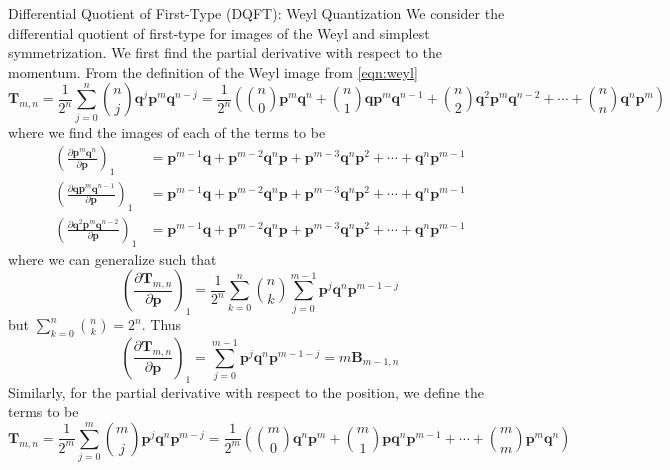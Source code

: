 \documentclass[aspectratio=169]{beamer}
\begin{document}
	\begin{frame}[allowframebreaks]{Differential Quotient of First-Type (DQFT): Weyl Quantization}
		We consider the differential quotient of first-type for images of the Weyl and simplest symmetrization. We first find the partial derivative with respect to the momentum. From the definition of the Weyl image from \ref{eqn:weyl}
		\begin{equation}
			\textbf{T}_{m,n}=\frac{1}{2^n}\sum_{j=0}^n\binom{n}{j}\textbf{q}^j\textbf{p}^m\textbf{q}^{n-j}=\frac{1}{2^n}\left(\binom{n}{0}\textbf{p}^m\textbf{q}^n+\binom{n}{1}\textbf{q}\textbf{p}^m\textbf{q}^{n-1}+\binom{n}{2}\textbf{q}^2\textbf{p}^m\textbf{q}^{n-2}+\cdots+\binom{n}{n}\textbf{q}^n\textbf{p}^m\right) 
		\end{equation}
		where we find the images of each of the terms to be
		\begin{align}
			\left(\frac{\partial\textbf{p}^m\textbf{q}^n}{\partial\textbf{p}}\right)_1&=\textbf{p}^{m-1}\textbf{q}+\textbf{p}^{m-2}\textbf{q}^n\textbf{p}+\textbf{p}^{m-3}\textbf{q}^n\textbf{p}^{2}+\cdots+\textbf{q}^n\textbf{p}^{m-1} \\
			\left(\frac{\partial\textbf{q}\textbf{p}^m\textbf{q}^{n-1}}{\partial\textbf{p}}\right)_1&=\textbf{p}^{m-1}\textbf{q}+\textbf{p}^{m-2}\textbf{q}^n\textbf{p}+\textbf{p}^{m-3}\textbf{q}^n\textbf{p}^{2}+\cdots+\textbf{q}^n\textbf{p}^{m-1} \\
			\left(\frac{\partial\textbf{q}^2\textbf{p}^m\textbf{q}^{n-2}}{\partial\textbf{p}}\right)_1&=\textbf{p}^{m-1}\textbf{q}+\textbf{p}^{m-2}\textbf{q}^n\textbf{p}+\textbf{p}^{m-3}\textbf{q}^n\textbf{p}^{2}+\cdots+\textbf{q}^n\textbf{p}^{m-1}
		\end{align}
		where we can generalize such that
		\begin{equation}
			\left(\frac{\partial\textbf{T}_{m,n}}{\partial\textbf{p}}\right)_1=\frac{1}{2^n}\sum_{k=0}^n\binom{n}{k}\sum_{j=0}^{m-1}\textbf{p}^j\textbf{q}^n\textbf{p}^{m-1-j}
		\end{equation}
		but $\displaystyle\sum_{k=0}^n\binom{n}{k}=2^n$. Thus
		\begin{equation}
			\left(\frac{\partial\textbf{T}_{m,n}}{\partial\textbf{p}}\right)_1=\sum_{j=0}^{m-1}\textbf{p}^j\textbf{q}^n\textbf{p}^{m-1-j}=m\textbf{B}_{m-1,n}
		\end{equation}
		Similarly, for the partial derivative with respect to the position, we define the terms to be
		\begin{equation}
			\textbf{T}_{m,n}=\frac{1}{2^m}\sum_{j=0}^m\binom{m}{j}\textbf{p}^j\textbf{q}^n\textbf{p}^{m-j}=\frac{1}{2^m}\left(\binom{m}{0}\textbf{q}^n\textbf{p}^m+\binom{m}{1}\textbf{p}\textbf{q}^n\textbf{p}^{m-1}+\cdots+\binom{m}{m}\textbf{p}^m\textbf{q}^n\right) 

\end{equation}
\end{frame}
\end{document}
